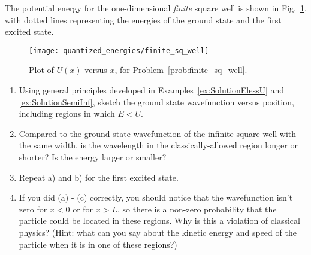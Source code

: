 \newpage


\begin{problem}
  The potential energy for the one-dimensional {\em finite} square
  well is shown in Fig.~\ref{fig:finite_sq_well}, with dotted lines
  representing the energies of the ground state and the first excited
  state.
\begin{figure}[h]
\begin{center}
\texttt{[image: quantized\_energies/finite\_sq\_well]}
\end{center}
\caption{Plot of $U(x)$ versus $x$, for Problem~\ref{prob:finite_sq_well}.}
\label{fig:finite_sq_well}
\end{figure}

\begin{enumerate}
\item Using general principles developed in Examples~\ref{ex:SolutionElessU} and \ref{ex:SolutionSemiInf}, sketch the ground state wavefunction versus position, including regions in which $E< U$.

\item Compared to the ground state wavefunction of the infinite square 
well with the same width, is the wavelength in the classically-allowed
region longer or shorter? Is 
the energy larger or smaller?  

\item Repeat a) and b) for the first excited state.

\item If you did (a) - (c) correctly, you should notice 
that the wavefunction isn't zero for $x < 0$ or for
$x > L$, so there is a non-zero probability that the particle could be
located in these regions. Why is this a violation of classical physics?
(Hint: what can you say about the kinetic energy and speed of the particle
when it is in one of these regions?)
\end{enumerate}
\label{prob:finite_sq_well}
\end{problem}



